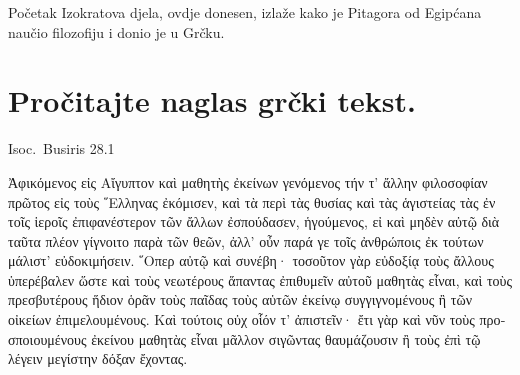 Početak Izokratova djela, ovdje donesen, izlaže kako je Pitagora od Egipćana naučio filozofiju i donio je u Grčku.


\section*{Pročitajte naglas grčki tekst.}


Isoc.\ Busiris 28.1

\medskip

{\large
\begin{greek}
\noindent Ἀφικόμενος εἰς Αἴγυπτον καὶ μαθητὴς ἐκείνων γενόμενος τήν τ' ἄλλην φιλοσοφίαν πρῶτος εἰς τοὺς ῞Ελληνας ἐκόμισεν, καὶ τὰ περὶ τὰς θυσίας καὶ τὰς ἁγιστείας τὰς ἐν τοῖς ἱεροῖς ἐπιφανέστερον τῶν ἄλλων ἐσπούδασεν, ἡγούμενος, εἰ καὶ μηδὲν αὐτῷ διὰ ταῦτα πλέον γίγνοιτο παρὰ τῶν θεῶν, ἀλλ' οὖν παρά γε τοῖς ἀνθρώποις ἐκ τούτων μάλιστ' εὐδοκιμήσειν. ῞Οπερ αὐτῷ καὶ συνέβη· τοσοῦτον γὰρ εὐδοξίᾳ τοὺς ἄλλους ὑπερέβαλεν ὥστε καὶ τοὺς νεωτέρους ἅπαντας ἐπιθυμεῖν αὐτοῦ μαθητὰς εἶναι, καὶ τοὺς πρεσβυτέρους ἥδιον ὁρᾶν τοὺς παῖδας τοὺς αὑτῶν ἐκείνῳ συγγιγνομένους ἢ τῶν οἰκείων ἐπιμελουμένους. Καὶ τούτοις οὐχ οἷόν τ' ἀπιστεῖν· ἔτι γὰρ καὶ νῦν τοὺς προσποιουμένους ἐκείνου μαθητὰς εἶναι μᾶλλον σιγῶντας θαυμάζουσιν ἢ τοὺς ἐπὶ τῷ λέγειν μεγίστην δόξαν ἔχοντας.

\end{greek}

}

